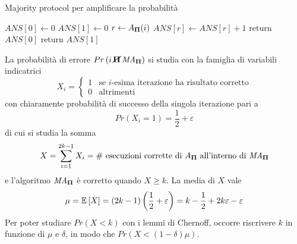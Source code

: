 \begin{algorithm}[H]
\caption{Majority protocol per amplificare la probabilità}\label{alg:maj_prot}
\begin{algorithmic}[1]
        \State $\mathit{ANS}[0] \gets 0 $
        \State $\mathit{ANS}[1] \gets 0 $
            \State $r \gets A_{\bm{\Pi}{}}(i)$
            \State $
            \mathit{ANS}[r]
            \gets 
            \mathit{ANS}[r] + 1
            $
        \EndFor
            \State return $\mathit{ANS}[0]$
        \Else
            \State return $\mathit{ANS}[1]$
        \EndIf
    \EndProcedure
\end{algorithmic}
\end{algorithm}
\noindent
La probabilità di errore $
Pr \left( 
    i
    \,
    \cancel{
        \bm{\Pi}{}
    }
    \,
    \mathit{MA}_{\bm{\Pi}{}}
\right)
$ si studia con la famiglia di variabili indicatrici 
\begin{equation*}
    X_i = 
    \begin{cases}
        1 & \text{se $i$-esima iterazione ha risultato corretto}
        \\
        0 & \text{altrimenti}
    \end{cases}
\end{equation*}
con chiaramente probabilità di successo della singola iterazione pari a 
\begin{equation*}
    Pr \left( 
        X_i = 1
    \right)
    =
    \frac{1}{2} + \varepsilon
\end{equation*}
di cui si studia la somma
\begin{equation*}
    X = \sum_{i=1}^{2k-1} X_i
    = \text{\# esecuzioni corrette di $
        A_{\bm{\Pi}{}}
    $ all'interno di $
        \mathit{MA}_{\bm{\Pi}{}}
    $}
\end{equation*}
e l'algoritmo $
    \mathit{MA}_{\bm{\Pi}{}}
$ è corretto quando $
X \geq k
$.
La media di $X$ vale
\begin{equation*}
    \mu
    = \mathbb{E}\left[X\right]
    = 
    \left( 2k - 1 \right)
    \left(
        \frac{1}{2}
        + \varepsilon
    \right)
    =
    k - 
    \frac{1}{2}
    + 2k\varepsilon - \varepsilon
\end{equation*}
Per poter studiare $
Pr \left( 
    X < k
\right)
$ con i lemmi di Chernoff, occorre riscrivere $k$ in funzione di $\mu$ e $\delta$, in modo che $
Pr \left( 
    X < \left( 1 - \delta \right) \mu
\right)
$.
